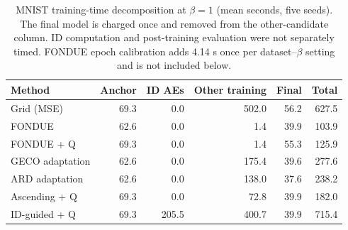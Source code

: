 \begin{table}[H]
\caption{MNIST training-time decomposition at $\beta=1$ (mean seconds, five seeds). The final model is charged once and removed from the other-candidate column. ID computation and post-training evaluation were not separately timed. FONDUE epoch calibration adds 4.14 s once per dataset--$\beta$ setting and is not included below.}\label{tab:cost}
\footnotesize
\setlength{\tabcolsep}{3.5pt}
\begin{tabular*}{\textwidth}{@{\extracolsep{\fill}}lrrrrr@{}}
\toprule
Method & Anchor & ID AEs & Other training & Final & Total \\
\midrule
Grid (MSE) & 69.3 & 0.0 & 502.0 & 56.2 & 627.5 \\
FONDUE & 62.6 & 0.0 & 1.4 & 39.9 & 103.9 \\
FONDUE + Q & 69.3 & 0.0 & 1.4 & 55.3 & 125.9 \\
GECO adaptation & 62.6 & 0.0 & 175.4 & 39.6 & 277.6 \\
ARD adaptation & 62.6 & 0.0 & 138.0 & 37.6 & 238.2 \\
Ascending + Q & 69.3 & 0.0 & 72.8 & 39.9 & 182.0 \\
ID-guided + Q & 69.3 & 205.5 & 400.7 & 39.9 & 715.4 \\
\bottomrule
\end{tabular*}
\end{table}
